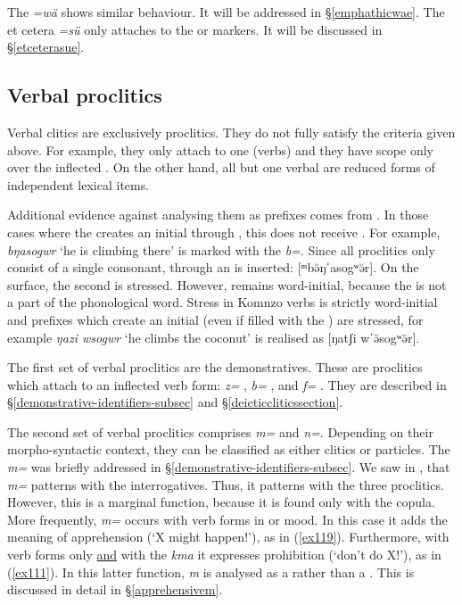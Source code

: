 The   \emph{=wä} shows similar behaviour. It will be addressed in {\S}\ref{emphathicwae}. The et cetera  \emph{=sü} only attaches to the  or   markers. It will be discussed in {\S}\ref{etceterasue}.

\subsection{Verbal proclitics}\label{verbal-proclitics-subsec}

Verbal clitics are exclusively proclitics. They do not fully satisfy the criteria given above. For example, they only attach to one  (verbs) and they have scope only over the inflected . On the other hand, all but one verbal  are reduced forms of independent lexical items.

Additional evidence against analysing them as prefixes comes from . In those cases where the  creates an initial  through , this  does not receive . For example, \emph{bŋasogwr} `he is climbing there' is marked with the   \emph{b=}. Since all proclitics only consist of a single consonant, through  an  is inserted: [ᵐbə̆ŋˈaso{\ᵑ}gʷə̆r]. On the surface, the second  is stressed. However,  remains word-initial, because the  is not a part of the phonological word. Stress in Komnzo verbs is strictly word-initial and prefixes which create an initial  (even if filled with the ) are stressed, for example \emph{ŋazi wsogwr} `he climbs the coconut' is realised as [ŋatʃi wˈə̆so{\ᵑ}gʷə̆r].

The first set of verbal proclitics are the  demonstratives. These are  proclitics which attach to an inflected verb form: \emph{z=} {\Prox}, \emph{b=} \Med{}, and \emph{f=} {\Dist}. They are described in {\S}\ref{demonstrative-identifiers-subsec} and {\S}\ref{deicticcliticssection}.

The second set of verbal proclitics comprises \emph{m=} and \emph{n=}. Depending on their morpho-syntactic context, they can be classified as either clitics or particles. The \emph{m=}  was briefly addressed in {\S}\ref{demonstrative-identifiers-subsec}. We saw in , that \emph{m=} patterns with the interrogatives. Thus, it patterns with the three  proclitics. However, this is a marginal function, because it is found only with the copula. More frequently, \emph{m=} occurs with verb forms in  or  mood. In this case it adds the meaning of apprehension (`X might happen!'), as in (\ref{ex119}). Furthermore, with  verb forms only \uline{and} with the   \emph{kma} it expresses prohibition (`don't do X!'), as in (\ref{ex111}). In this latter function, \emph{m} is analysed as a  rather than a . This is discussed in detail in {\S}\ref{apprehensivem}.

